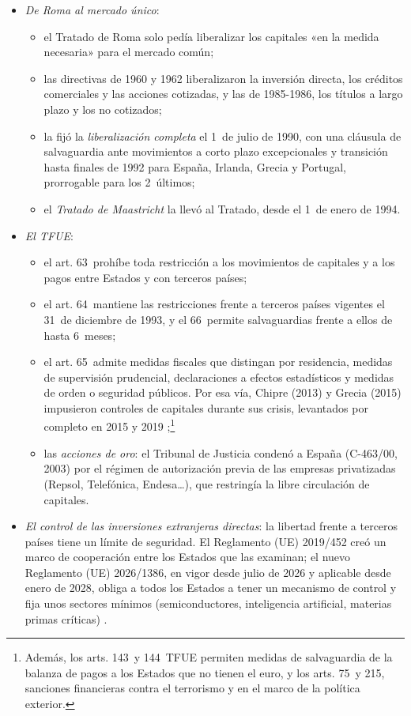 \documentclass[11pt]{article}
\begin{document}
\begin{itemize}
\item \emph{De Roma al mercado único}:
  \begin{itemize}
  \item el Tratado de Roma solo pedía liberalizar los capitales «en la medida necesaria» para el mercado común;
  \item las directivas de 1960 y 1962 liberalizaron la inversión directa, los créditos comerciales y las acciones cotizadas, y las de 1985-1986, los títulos a largo plazo y los no cotizados;
  \item la  fijó la \emph{liberalización completa} el 1~de julio de 1990, con una cláusula de salvaguardia ante movimientos a corto plazo excepcionales y transición hasta finales de 1992 para España, Irlanda, Grecia y Portugal, prorrogable para los 2~últimos\nocite{UE1988Capitales};
  \item el \emph{Tratado de Maastricht} la llevó al Tratado, desde el 1~de enero de 1994.
  \end{itemize}
\item \emph{El TFUE}:
  \begin{itemize}
  \item el art. 63~prohíbe toda restricción a los movimientos de capitales y a los pagos entre Estados y con terceros países;
  \item el art. 64~mantiene las restricciones frente a terceros países vigentes el 31~de diciembre de 1993, y el 66~permite salvaguardias frente a ellos de hasta 6~meses;
  \item el art. 65~admite medidas fiscales que distingan por residencia, medidas de supervisión prudencial, declaraciones a efectos estadísticos y medidas de orden o seguridad públicos. Por esa vía, Chipre (2013) y Grecia (2015) impusieron controles de capitales durante sus crisis, levantados por completo en 2015 y 2019 ;\footnote{Además, los arts. 143~y 144~TFUE permiten medidas de salvaguardia de la balanza de pagos a los Estados que no tienen el euro, y los arts. 75~y 215, sanciones financieras contra el terrorismo y en el marco de la política exterior.}
  \item las \emph{acciones de oro}: el Tribunal de Justicia condenó a España (C-463/00, 2003) por el régimen de autorización previa de las empresas privatizadas (Repsol, Telefónica, Endesa…), que restringía la libre circulación de capitales.
  \end{itemize}
\item \emph{El control de las inversiones extranjeras directas}: la libertad frente a terceros países tiene un límite de seguridad. El Reglamento (UE) 2019/452 creó un marco de cooperación entre los Estados que las examinan; el nuevo Reglamento (UE) 2026/1386, en vigor desde julio de 2026 y aplicable desde enero de 2028, obliga a todos los Estados a tener un mecanismo de control y fija unos sectores mínimos (semiconductores, inteligencia artificial, materias primas críticas)\nocite{UE2026Inversiones} .

\end{itemize}
\end{document}
